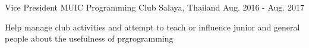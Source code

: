 

\begin{cventries}

  \cventry
    {Vice President} %
    {MUIC Programming Club} %
    {Salaya, Thailand} %
    {Aug. 2016 - Aug. 2017} %
    {
      \begin{cvitems} %
        \item {Help manage club activities and attempt to teach or influence junior and general people about the usefulness of prgrogramming}
      \end{cvitems}
    }

\end{cventries}
